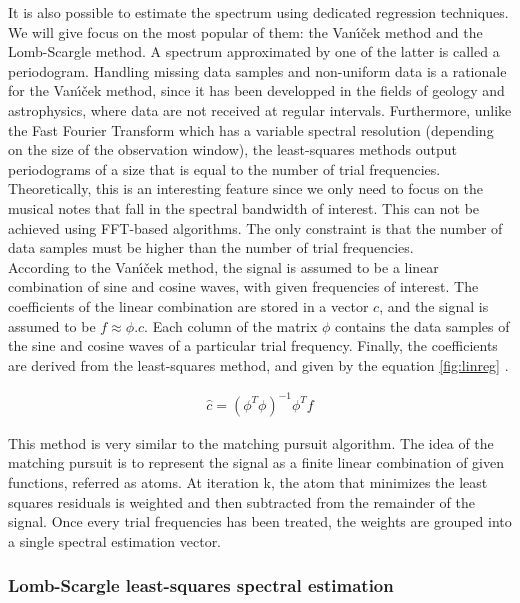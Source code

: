 \documentclass[letterpaper]{article}
\begin{document}
It is also possible to estimate the spectrum using dedicated regression techniques. We will give focus on the most popular of them:
the Van\'{\i}\v{c}ek method and the Lomb-Scargle method. A spectrum approximated by one of the latter is called a periodogram.
Handling missing data samples and non-uniform data is a rationale for the Van\'{\i}\v{c}ek method, since it has been developped in the fields of
geology and astrophysics, where data are not received at regular intervals. Furthermore, unlike the Fast Fourier Transform which has a
variable spectral resolution (depending on the size of the observation window), the least-squares methods output periodograms of a size
that is equal to the number of trial frequencies. Theoretically, this is an interesting feature since we only need to focus on the musical notes that fall in the spectral bandwidth of interest. This can not be achieved using FFT-based algorithms. The only constraint is that the number of data samples must be higher than the number of trial frequencies.\\

According to the Van\'{\i}\v{c}ek method, the signal is assumed to be a linear combination of sine and cosine waves, with given frequencies of interest.
The coefficients of the linear combination are stored in a vector $c$, and the signal is assumed to be $f \approx \phi.c$. 
Each column of the matrix $\phi$ contains the data samples of the sine and cosine waves of a particular trial frequency.
Finally, the coefficients are derived from the least-squares method, and given by the equation \ref{fig:linreg} \citep{PS}.

\begin{align}
\hat{c} = (\phi^{T} \phi)^{-1} \phi^{T} f
\label{fig:linreg}
\end{align}

This method is very similar to the matching pursuit algorithm. The idea of the matching pursuit is to represent the signal as a finite linear combination of given
functions, referred as atoms. At iteration k, the atom that minimizes the least squares residuals is weighted and then subtracted from 
the remainder of the signal. Once every trial frequencies has been treated, the weights are grouped into a single spectral estimation vector.

\subsubsection{Lomb-Scargle least-squares spectral estimation}
\end{document}
